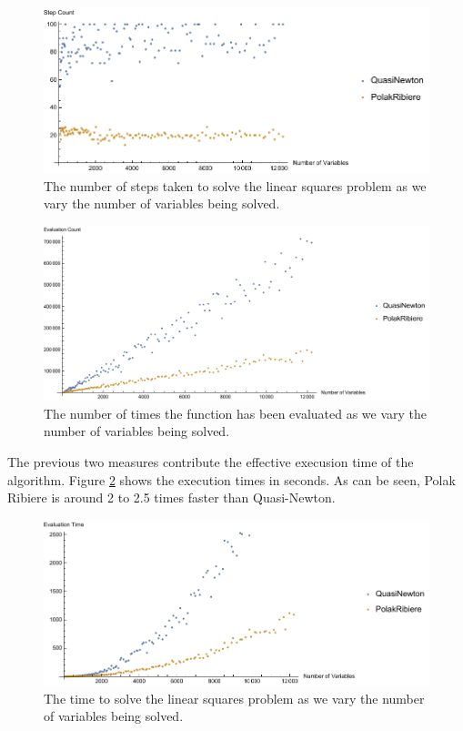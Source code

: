 \documentclass[]{article}
\begin{document}
\begin{figure}[htbp]
\centering
\includegraphics{step.pdf}
\caption{The number of steps taken to solve the linear squares problem
as we vary the number of variables being solved.}
\end{figure}

\begin{figure}[t!]
\centering
\includegraphics{eval.pdf}
\caption{The number of times the function has been evaluated as we vary the number of variables being solved.}
\label{fig:eval}
\end{figure}

The previous two measures contribute the effective execusion time of the
algorithm. Figure \ref{fig:time} shows the execution times in seconds.
As can be seen, Polak Ribiere is around 2 to 2.5 times faster than
Quasi-Newton.

\begin{figure}[t!]
\centering
\includegraphics{time.pdf}
\caption{The time to solve the linear squares problem as we vary the number of variables being solved.}
\label{fig:time}
\end{figure}
\end{document}
